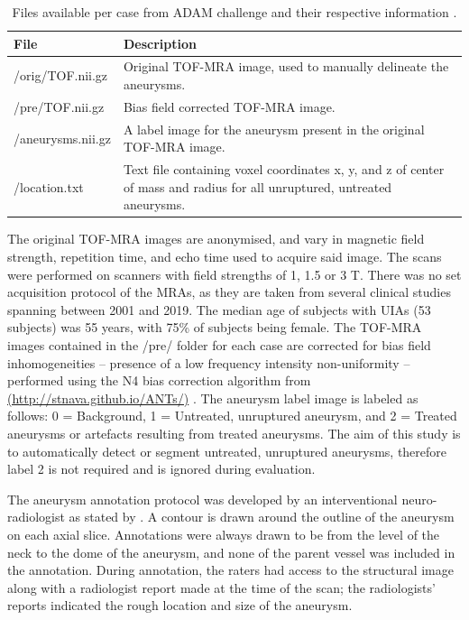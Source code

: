 \begin{table}[h]
	\centering
	\begin{tabular}{ l  | p{8cm} }
	\textbf{File} & \textbf{Description} \\
	\hline
	/orig/TOF.nii.gz & Original TOF-MRA image, used to manually delineate the aneurysms. \\
	/pre/TOF.nii.gz & Bias field corrected TOF-MRA image. \\
	/aneurysms.nii.gz & A label image for the aneurysm present in the original TOF-MRA image.\\
	/location.txt & Text file containing voxel coordinates x, y, and z of center of mass and radius for all unruptured, untreated aneurysms. \\
	\end{tabular}
		
	\caption[Table of files contained dataset]{Files available per case from ADAM challenge and their respective information \cite{Timmins2020}.}
	\label{table:adam_files}
	
\end{table}

The original TOF-MRA images are anonymised, and vary in magnetic field strength, repetition time, and echo time used to acquire said image. The scans were performed on scanners with field strengths of 1, 1.5 or 3 T. There was no set acquisition protocol of the MRAs, as they are taken from several clinical studies spanning between 2001 and 2019. The median age of subjects with UIAs (53 subjects) was 55 years, with 75\% of subjects being female.
The TOF-MRA images contained in the /pre/ folder for each case are corrected for bias field inhomogeneities -- presence of a low frequency intensity non-uniformity -- performed using the N4 bias correction algorithm from \href{http://stnava.github.io/ANTs/}{(http://stnava.github.io/ANTs/)} \cite{Tustison2010}. The aneurysm label image is labeled as follows: 0 = Background, 1 = Untreated, unruptured aneurysm, and 2 = Treated aneurysms or artefacts resulting from treated aneurysms. The aim of this study is to automatically detect or segment untreated, unruptured aneurysms, therefore label 2 is not required and is ignored during evaluation. 

The aneurysm annotation protocol was developed by an interventional neuro-radiologist as stated by \citeauthor{Timmins2020}. A contour is drawn around the outline of the aneurysm on each axial slice. Annotations were always drawn to be from the level of the neck to the dome of the aneurysm, and none of the parent vessel was included in the annotation. During annotation, the raters had access to the structural image along with a radiologist report made at the time of the scan; the radiologists’ reports indicated the rough location and size of the aneurysm.

